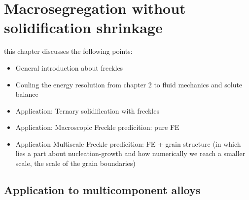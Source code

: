 \chapter{Macrosegregation without solidification shrinkage}
\minitoc
\newpage

this chapter discusses the following points:
\begin{itemize}
\item General introduction about freckles
\item Couling the energy resolution from chapter 2 to fluid mechanics and solute balance
\item Application: Ternary solidification with freckles
\item Application: Macroscopic Freckle predicition: pure FE
\item Application Multiscale Freckle predicition: FE + grain structure (in which lies a part about nucleation-growth and how numerically 
		we reach a smaller scale, the scale of the grain boundaries)
\end{itemize}


\section{Application to multicomponent alloys}

